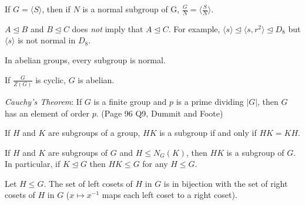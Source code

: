\documentclass{article}
\numberwithin{equation}{section}
\theoremstyle{definition}
\numberwithin{definition}{section}
\numberwithin{theorem}{section}
\theoremstyle{remark}
\numberwithin{exercise}{section}
\begin{document}
    If $G = \langle S \rangle$, then if $N$ is a normal subgroup of G, $\frac GN = \langle \frac SN\rangle$.
    
    $A\mathrel{\unlhd} B$ and $B\mathrel{\unlhd} C$ does \textit{not} imply that $A\mathrel{\unlhd} C$.
    For example, $\langle s \rangle \mathrel{\unlhd} \langle s, r^2 \rangle \mathrel\unlhd D_8$ but $\langle s\rangle$ is not normal in $D_8$.
    
    In abelian groups, every subgroup is normal.
    
    If $\frac{G}{Z(G)}$ is cyclic, $G$ is abelian.
    
    \textit{Cauchy's Theorem}: If $G$ is a finite group and $p$ is a prime dividing $|G|$, then $G$ has an element of order $p$. (Page 96 Q9, Dummit and Foote)
    
    If $H$ and $K$ are subgroups of a group, $HK$ is a subgroup if and only if $HK=KH$.
    
    If $H$ and $K$ are subgroups of $G$ and $H\leq N_G(K)$, then $HK$ is a subgroup of $G$. In particular, if $K\mathrel{\unlhd} G$ then $HK\leq G$ for any $H\leq G$.
    
    Let $H\leq G$. The set of left cosets of $H$ in $G$ is in bijection with the set of right cosets of $H$ in $G$ ($x\mapsto x^{-1}$ maps each left coset to a right coset).
    
\end{document}
